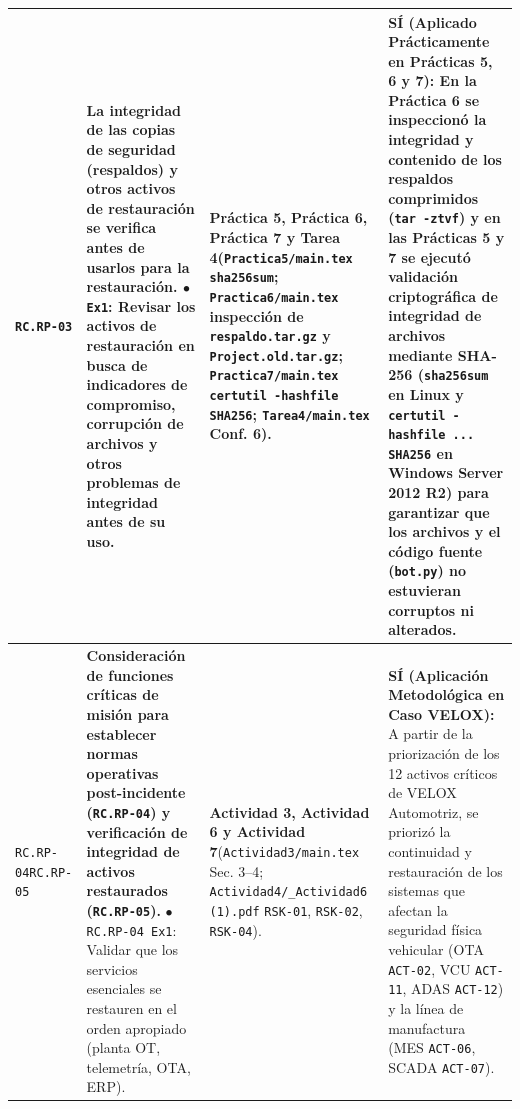 \documentclass[letterpaper,11pt]{article}
\begin{document}
\begin{longtable}{|C{1.5cm}|L{5.3cm}|L{4.3cm}|L{5.8cm}|}
\texttt{RC.RP-03} &
\textbf{La integridad de las copias de seguridad (respaldos) y otros activos de restauración se verifica antes de usarlos para la restauración.}\newline
$\bullet$ \texttt{Ex1}: \textbf{Revisar los activos de restauración en busca de indicadores de compromiso, corrupción de archivos y otros problemas de integridad antes de su uso}. &
\textbf{Práctica 5, Práctica 6, Práctica 7 y Tarea 4}\newline (\texttt{Practica5/main.tex} \texttt{sha256sum}; \texttt{Practica6/main.tex} inspección de \texttt{respaldo.tar.gz} y \texttt{Project.old.tar.gz}; \texttt{Practica7/main.tex} \texttt{certutil -hashfile SHA256}; \texttt{Tarea4/main.tex} Conf. 6). &
\textbf{SÍ (Aplicado Prácticamente en Prácticas 5, 6 y 7):}\newline
En la \textbf{Práctica 6} se inspeccionó la integridad y contenido de los respaldos comprimidos (\texttt{tar -ztvf}) y en las \textbf{Prácticas 5 y 7} se ejecutó validación criptográfica de integridad de archivos mediante \textbf{SHA-256} (\texttt{sha256sum} en Linux y \texttt{certutil -hashfile ... SHA256} en Windows Server 2012 R2) para garantizar que los archivos y el código fuente (\texttt{bot.py}) no estuvieran corruptos ni alterados. \\
\hline

\texttt{RC.RP-04}\newline \texttt{RC.RP-05} &
\textbf{Consideración de funciones críticas de misión para establecer normas operativas post-incidente (\texttt{RC.RP-04}) y verificación de integridad de activos restaurados (\texttt{RC.RP-05}).}\newline
$\bullet$ \texttt{RC.RP-04 Ex1}: Validar que los servicios esenciales se restauren en el orden apropiado (planta OT, telemetría, OTA, ERP). &
\textbf{Actividad 3, Actividad 6 y Actividad 7}\newline (\texttt{Actividad3/main.tex} Sec. 3--4; \texttt{Actividad4/\_Actividad6 (1).pdf} \texttt{RSK-01}, \texttt{RSK-02}, \texttt{RSK-04}). &
\textbf{SÍ (Aplicación Metodológica en Caso VELOX):}\newline
A partir de la priorización de los 12 activos críticos de VELOX Automotriz, se priorizó la continuidad y restauración de los sistemas que afectan la seguridad física vehicular (OTA \texttt{ACT-02}, VCU \texttt{ACT-11}, ADAS \texttt{ACT-12}) y la línea de manufactura (MES \texttt{ACT-06}, SCADA \texttt{ACT-07}). \\
\hline


\end{longtable}
\end{document}
